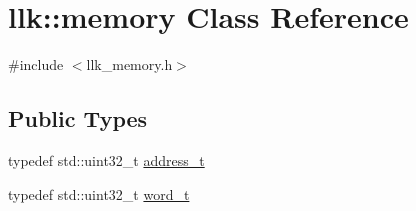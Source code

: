 \hypertarget{classllk_1_1memory}{}\section{llk\+:\+:memory Class Reference}
\label{classllk_1_1memory}


{\ttfamily \#include $<$llk\+\_\+memory.\+h$>$}

\subsection*{Public Types}
\begin{DoxyCompactItemize}
\item 
typedef std\+::uint32\+\_\+t \hyperlink{classllk_1_1memory_ae7a4b897aa999f22e250dc8e4d773dec}{address\+\_\+t}
\item 
typedef std\+::uint32\+\_\+t \hyperlink{classllk_1_1memory_a432a6c0ae1bcb9c44d79cfa1a239419c}{word\+\_\+t}
\end{DoxyCompactItemize}
